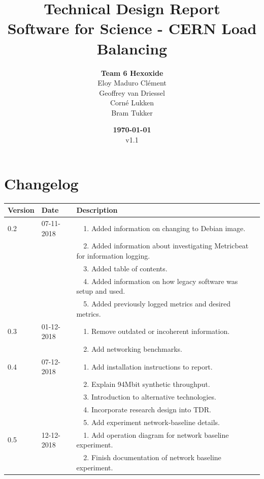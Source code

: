 \documentclass[]{article}
\title{Technical Design Report \\
	\large Software for Science - CERN Load Balancing}
\author{\textbf{Team 6 Hexoxide} \\
	Eloy Maduro Clément \\
	Geoffrey van Driessel \\
	Corné Lukken \\
	Bram Tukker}
\date{\textbf{\today} \\
	v1.1}
\newcommand{\tabitemNum}{~~}
\begin{document}
\maketitle
\newpage

\tableofcontents{}
\newpage

\section*{Changelog}
\begin{table}[H]
	\begin{center}	
		\begin{tabularx}{\textwidth}{ | l | l | X | }
			\hline
			\textbf{Version} & \textbf{Date} & \textbf{Description} \\ \hline
			
			\multirow{1}{*}{0.2} & 07-11-2018 & \tabitemNum 1. Added information on changing to Debian image. \\
			& & \tabitemNum 2. Added information about investigating Metricbeat for information logging. \\
			& & \tabitemNum 3. Added table of contents. \\
			& & \tabitemNum 4. Added information on how legacy software was setup and used. \\
			& & \tabitemNum 5. Added previously logged metrics and desired metrics. \\ \hline
			
			\multirow{1}{*}{0.3} & 01-12-2018 & \tabitemNum 1. Remove outdated or incoherent information. \\
			& & \tabitemNum 2. Add networking benchmarks. \\ \hline
			
			\multirow{1}{*}{0.4} & 07-12-2018 & \tabitemNum 1. Add installation instructions to report. \\
			& & \tabitemNum 2. Explain 94Mbit synthetic throughput. \\
			& & \tabitemNum 3. Introduction to alternative technologies. \\
			& & \tabitemNum 4. Incorporate research design into TDR. \\
			& & \tabitemNum 5. Add experiment network-baseline details. \\ \hline
			
			\multirow{1}{*}{0.5} & 12-12-2018 & \tabitemNum 1. Add operation diagram for network baseline experiment. \\
			& & \tabitemNum 2. Finish documentation of network baseline experiment. \\ \hline
			

\end{tabularx}
\end{center}
\end{table}
\end{document}
